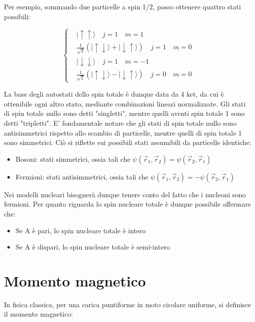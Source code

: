 \documentclass{article}
\begin{document}
Per esempio, sommando due particelle a spin 1/2, posso ottenere quattro stati possibili:

\begin{equation}
    \left\{
    \begin{aligned}
         & |\uparrow\uparrow\rangle \quad j=1 \quad m=1                                                   \\
         & \frac{1}{\sqrt{2}} (|\uparrow\downarrow\rangle+|\downarrow\uparrow\rangle) \quad j=1 \quad m=0 \\
         & |\downarrow\downarrow\rangle \quad j=1 \quad m=-1                                              \\
         & \frac{1}{\sqrt{2}} (|\uparrow\downarrow\rangle-|\downarrow\uparrow\rangle) \quad j=0 \quad m=0
    \end{aligned}
    \right.
\end{equation}

La base degli autostati dello spin totale è dunque data da 4 ket, da cui è ottenibile ogni altro stato, mediante combinazioni lineari normalizzate.
Gli stati di spin totale nullo sono detti "singletti", mentre quelli aventi spin totale 1 sono detti "tripletti".
E' fondamentale notare che gli stati di spin totale nullo sono antisimmetrici rispetto allo scambio di particelle, mentre quelli di spin totale 1 sono simmetrici.
Ciò si riflette sui possibili stati assumibili da particelle identiche:

\begin{itemize}
    \item Bosoni: stati simmetrici, ossia tali che $\psi(\vec{r}_1,\vec{r}_2)=\psi(\vec{r}_2,\vec{r}_1)$
    \item Fermioni: stati antisimmetrici, ossia tali che $\psi(\vec{r}_1,\vec{r}_2)=-\psi(\vec{r}_2,\vec{r}_1)$
\end{itemize}

Nei modelli nucleari bisognerà dunque tenere conto del fatto che i nucleoni sono fermioni.
Per quanto riguarda lo spin nucleare totale è dunque possibile affermare che:

\begin{itemize}
    \item Se A è pari, lo spin nucleare totale è intero
    \item Se A è dispari, lo spin nucleare totale è semi-intero
\end{itemize}


\section{Momento magnetico}
In fisica classica, per una carica puntiforme in moto cicolare uniforme, si definisce il momento magnetico:
\end{document}
